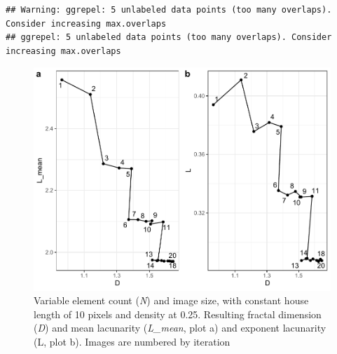 \documentclass[
  12pt,
]{book}
\begin{document}
\begin{verbatim}
## Warning: ggrepel: 5 unlabeled data points (too many overlaps). Consider increasing max.overlaps
## ggrepel: 5 unlabeled data points (too many overlaps). Consider increasing max.overlaps
\end{verbatim}

\begin{figure}

{\centering \includegraphics[width=0.9\linewidth]{bookdown-demo_files/figure-latex/08-N-IS-1} 

}

\caption{Variable element count (\emph{N}) and image size, with constant house length of 10 pixels and density at 0.25. Resulting fractal dimension (\emph{D}) and mean lacunarity (\emph{L\_mean}, plot a) and exponent lacunarity (L, plot b). Images are numbered by iteration}\label{fig:08-N-IS}
\end{figure}
\end{document}
